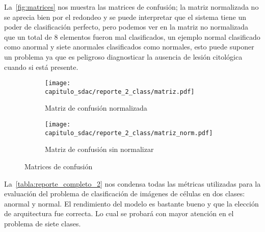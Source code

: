 \begin{table}[H]
    \centering
    \caption{Reporte de clasificación binario}
    \label{tabla:reporte_2}
    \end{table}

La~\autoref{fig:matrices} nos muestra las matrices de confusión; la matriz
normalizada no se aprecia bien por el redondeo y se puede interpretar que el
sistema tiene un poder de clasificación perfecto, pero podemos ver en la matriz
no normalizada que un total de 8 elementos fueron mal clasificados, un ejemplo
normal clasificado como anormal y siete anormales clasificados como normales,
esto puede suponer un problema ya que es peligroso diagnosticar la ausencia de
lesión citológica cuando si está presente.

\begin{figure}[H]
    \centering
    \begin{subfigure}[b]{0.6\textwidth}
        \centering 
        \texttt{[image: capitulo\_sdac/reporte\_2\_class/matriz.pdf]}
        \caption{Matriz de confusión normalizada}\label{fig:matriz_norm}
        \end{subfigure}
    \begin{subfigure}[b]{0.6\textwidth}
        \centering 
        \texttt{[image: capitulo\_sdac/reporte\_2\_class/matriz\_norm.pdf]}
        \caption{Matriz de confusión sin normalizar}\label{fig:matriz_sin}
    \end{subfigure}%
        \caption{Matrices de confusión} 
        \label{fig:matrices}
\end{figure}
    
La~\autoref{tabla:reporte_completo_2} nos condensa todas las métricas utilizadas
para la evaluación del problema de clasificación de imágenes de células en dos
clases: anormal y normal. El rendimiento del modelo es bastante bueno y que la
elección de arquitectura fue correcta. Lo cual se probará con mayor atención en
el problema de siete clases. 

